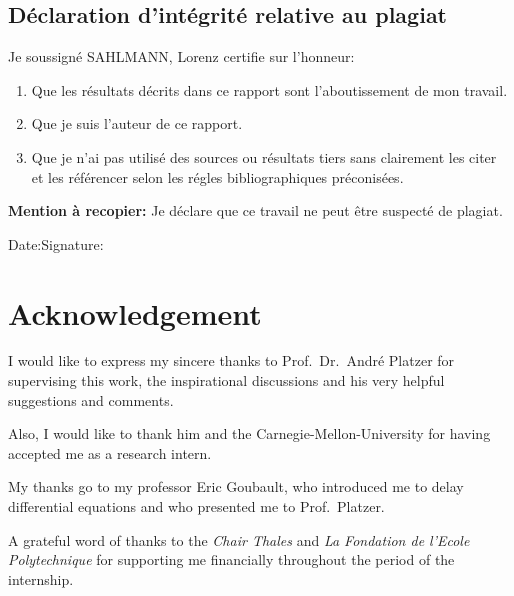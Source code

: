 \begin{otherlanguage}{frenchb}
    \section*{Déclaration d’intégrité relative au plagiat}

    Je soussigné SAHLMANN, Lorenz certifie sur l’honneur:
    \begin{enumerate}
        \item Que les résultats décrits dans ce rapport sont l’aboutissement de mon travail.
        \item Que je suis l’auteur de ce rapport.
        \item Que je n’ai pas utilisé des sources ou résultats tiers sans clairement les citer et les référencer selon les régles bibliographiques préconisées.
    \end{enumerate}

    \textbf{Mention à recopier:}
    Je déclare que ce travail ne peut être suspecté de plagiat.

    \vspace{2cm}
    Date:\hfil Signature:

\end{otherlanguage}

\cleardoublepage

\chapter*{Acknowledgement}
    I would like to express my sincere thanks to Prof.~Dr.~André Platzer for supervising this work, the inspirational discussions and his very helpful suggestions and comments.

    Also, I would like to thank him and the Carnegie-Mellon-University for having accepted me as a research intern. 

    My thanks go to my professor Eric Goubault, who introduced me to delay differential equations and who presented me to Prof.~Platzer.

    A grateful word of thanks to the \emph{Chair Thales} and \foreignlanguage{frenchb}{\emph{La Fondation de l'Ecole Polytechnique}} for supporting me financially throughout the period of the internship.
